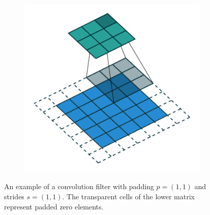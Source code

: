 \begin{figure}[h!]
\begin{subfigure}[b]{0.32\textwidth}
  \end{subfigure}
  \begin{subfigure}[b]{0.32\textwidth}
    \includegraphics[width=\textwidth]{figures/padding_strides_02}
  \end{subfigure}
  \caption{An example of a convolution filter with padding $p=(1,1)$ and strides $s = (1,1)$. The transparent cells of the lower matrix represent padded zero elements.}
  \label{fig:conv_padding_strides}
\end{figure}

